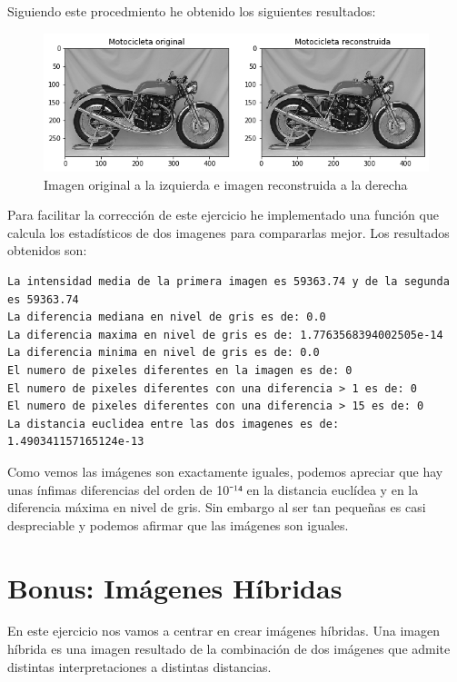 \documentclass[12pt,spanish]{article}
\begin{document}
Siguiendo este procedmiento he obtenido los siguientes resultados:

\begin{figure}[H]
	\includegraphics[width=\textwidth]{./imagenes_memoria/reconstruccion_imagen.png}
	\caption{Imagen original a la izquierda e imagen reconstruida a la derecha}
	\label{reconstruccion_imagen}
\end{figure}

Para facilitar la corrección de este ejercicio he implementado una función que calcula los estadísticos de dos imagenes para compararlas mejor. Los resultados obtenidos son:

\begin{lstlisting}[frame=single]
La intensidad media de la primera imagen es 59363.74 y de la segunda es 59363.74
La diferencia mediana en nivel de gris es de: 0.0 
La diferencia maxima en nivel de gris es de: 1.7763568394002505e-14 
La diferencia minima en nivel de gris es de: 0.0 
El numero de pixeles diferentes en la imagen es de: 0
El numero de pixeles diferentes con una diferencia > 1 es de: 0
El numero de pixeles diferentes con una diferencia > 15 es de: 0
La distancia euclidea entre las dos imagenes es de:  1.490341157165124e-13
\end{lstlisting}

Como vemos las imágenes son exactamente iguales, podemos apreciar que hay unas ínfimas diferencias del orden de 10⁻¹⁴ en la distancia euclídea y en la diferencia máxima en nivel de gris. Sin embargo al ser tan pequeñas es casi despreciable y podemos afirmar que las imágenes son iguales.

\section{Bonus: Imágenes Híbridas}
En este ejercicio nos vamos a centrar en crear imágenes híbridas. Una imagen híbrida es una imagen resultado de la  combinación de dos imágenes que admite distintas interpretaciones a distintas distancias.
\end{document}

